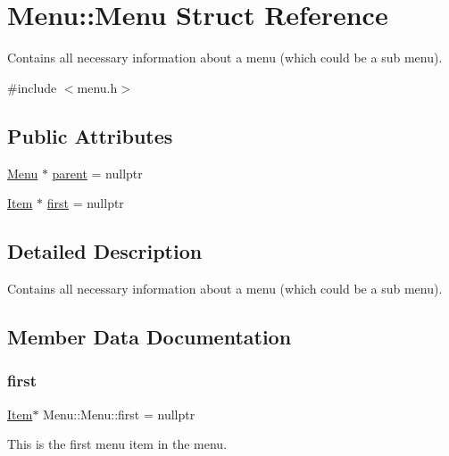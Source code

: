 \hypertarget{struct_menu_1_1_menu}{}\section{Menu\+:\+:Menu Struct Reference}
\label{struct_menu_1_1_menu}


Contains all necessary information about a menu (which could be a sub menu).  




{\ttfamily \#include $<$menu.\+h$>$}

\subsection*{Public Attributes}
\begin{DoxyCompactItemize}
\item 
\hyperlink{struct_menu_1_1_menu}{Menu} $\ast$ \hyperlink{struct_menu_1_1_menu_accedb5340f42f80cf0876b4d1e4df512}{parent} = nullptr
\item 
\hyperlink{struct_menu_1_1_item}{Item} $\ast$ \hyperlink{struct_menu_1_1_menu_aa9cb1f287490ac21ebac38e997c21af0}{first} = nullptr
\end{DoxyCompactItemize}


\subsection{Detailed Description}
Contains all necessary information about a menu (which could be a sub menu). 

\subsection{Member Data Documentation}
\hypertarget{struct_menu_1_1_menu_aa9cb1f287490ac21ebac38e997c21af0}{}\label{struct_menu_1_1_menu_aa9cb1f287490ac21ebac38e997c21af0} 
\subsubsection{\texorpdfstring{first}{first}}
{\footnotesize\ttfamily \hyperlink{struct_menu_1_1_item}{Item}$\ast$ Menu\+::\+Menu\+::first = nullptr}

This is the first menu item in the menu. \hypertarget{struct_menu_1_1_menu_accedb5340f42f80cf0876b4d1e4df512}{}\label{struct_menu_1_1_menu_accedb5340f42f80cf0876b4d1e4df512} 
